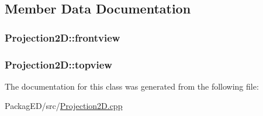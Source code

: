 \subsection{Member Data Documentation}
\subsubsection[{\texorpdfstring{frontview}{frontview}}]{ Projection2\+D\+::frontview}\hypertarget{class_projection2_d_a1eb4d010190b1bd62bf0f9c4e4afc88a}{}\label{class_projection2_d_a1eb4d010190b1bd62bf0f9c4e4afc88a}
\subsubsection[{\texorpdfstring{topview}{topview}}]{ Projection2\+D\+::topview}\hypertarget{class_projection2_d_a90079954379a766f60ba01ad393327ab}{}\label{class_projection2_d_a90079954379a766f60ba01ad393327ab}


The documentation for this class was generated from the following file\+:\begin{DoxyCompactItemize}
\item 
Packag\+E\+D/src/\hyperlink{_projection2_d_8cpp}{Projection2\+D.\+cpp}\end{DoxyCompactItemize}
